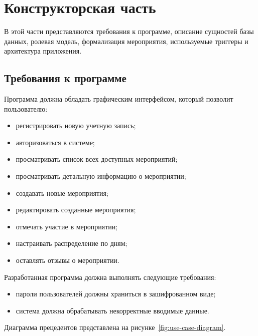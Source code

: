 \chapter{Конструкторская часть}

В этой части представляются требования к программе, описание сущностей базы данных, ролевая модель, формализация мероприятия, используемые триггеры и архитектура приложения.

\section{Требования к программе}

Программа должна обладать графическим интерфейсом, который позволит пользователю:  

\begin{itemize}[label=--]
	\item регистрировать новую учетную запись;  
	\item авторизоваться в системе;  
	\item просматривать список всех доступных мероприятий;  
	\item просматривать детальную информацию о мероприятии;  
	\item создавать новые мероприятия;  
	\item редактировать созданные мероприятия;  
	\item отмечать участие в мероприятии;  
	\item настраивать распределение по дням;  
	\item оставлять отзывы о мероприятии.  
\end{itemize}  

Разработанная программа должна выполнять следующие требования:  

\begin{itemize}[label=--]
	\item пароли пользователей должны храниться в зашифрованном виде;  
	\item система должна обрабатывать некорректные вводимые данные.
\end{itemize}  

\newpage

Диаграмма прецедентов представлена на рисунке~\ref{fig:use-case-diagram}.

